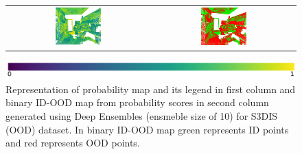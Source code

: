 \begin{figure}[h!]
\begin{tabular}{cc}
            \includegraphics[width=0.33\textwidth, height=0.18\textheight]{images/ood_imgs/de_s3dis/ofc_42_de_prob.pdf}& 
            \includegraphics[width=0.33\textwidth, height=0.18\textheight]{images/ood_imgs/de_s3dis/de_prob_1.pdf}\\
        \end{tabular}
        \includegraphics[scale=0.45]{images/prob_legend.pdf}
        \caption{Representation of probability map and its legend in first column and binary ID-OOD map from probability scores in second column generated using Deep Ensembles (ensmeble size of 10) for S3DIS (OOD) dataset. In binary ID-OOD map green represents ID points and red represents OOD points.}
        \label{fig:de_s3dis_oodmap_prob}
    \end{figure}
